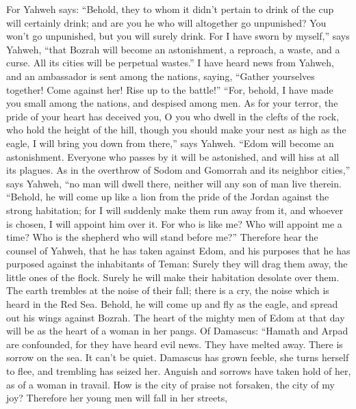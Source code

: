  For Yahweh says: ``Behold, they to whom it didn't
pertain to drink of the cup will certainly drink; and are you he who
will altogether go unpunished? You won't go unpunished, but you will
surely drink.  For I have sworn by myself,'' says Yahweh,
``that Bozrah will become an astonishment, a reproach, a waste, and a
curse. All its cities will be perpetual wastes.''  I have
heard news from Yahweh, and an ambassador is sent among the nations,
saying, ``Gather yourselves together! Come against her! Rise up to the
battle!''  ``For, behold, I have made you small among the
nations, and despised among men.  As for your terror, the
pride of your heart has deceived you, O you who dwell in the clefts of
the rock, who hold the height of the hill, though you should make your
nest as high as the eagle, I will bring you down from there,'' says
Yahweh.  ``Edom will become an astonishment. Everyone who
passes by it will be astonished, and will hiss at all its plagues.
 As in the overthrow of Sodom and Gomorrah and its
neighbor cities,'' says Yahweh, ``no man will dwell there, neither will
any son of man live therein.  ``Behold, he will come up
like a lion from the pride of the Jordan against the strong habitation;
for I will suddenly make them run away from it, and whoever is chosen, I
will appoint him over it. For who is like me? Who will appoint me a
time? Who is the shepherd who will stand before me?'' 
Therefore hear the counsel of Yahweh, that he has taken against Edom,
and his purposes that he has purposed against the inhabitants of Teman:
Surely they will drag them away, the little ones of the flock. Surely he
will make their habitation desolate over them.  The earth
trembles at the noise of their fall; there is a cry, the noise which is
heard in the Red Sea.  Behold, he will come up and fly as
the eagle, and spread out his wings against Bozrah. The heart of the
mighty men of Edom at that day will be as the heart of a woman in her
pangs.  Of Damascus: ``Hamath and Arpad are confounded,
for they have heard evil news. They have melted away. There is sorrow on
the sea. It can't be quiet.  Damascus has grown feeble,
she turns herself to flee, and trembling has seized her. Anguish and
sorrows have taken hold of her, as of a woman in travail.
 How is the city of praise not forsaken, the city of my
joy?  Therefore her young men will fall in her streets,
